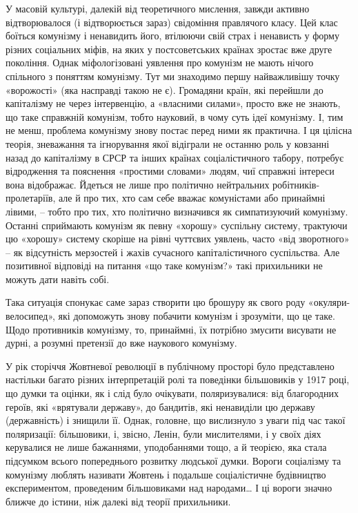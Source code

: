 \documentclass[../main]{subfiles}
\begin{document}
У масовій культурі, далекій від теоретичного мислення, завжди активно відтворювалося (і відтворюється зараз) свідоміння правлячого класу. Цей клас боїться комунізму і ненавидить його, втілюючи свій страх і ненависть у форму різних соціальних міфів, на яких у постсоветських країнах зростає вже друге покоління. Однак міфологізовані уявлення про комунізм не мають нічого спільного з поняттям комунізму. Тут ми знаходимо першу найважливішу точку «ворожості» (яка насправді такою не є). Громадяни країн, які перейшли до капіталізму не через інтервенцію, а «власними силами», просто вже не знають, що таке справжній комунізм, тобто науковий, в чому суть ідеї комунізму. І, тим не менш, проблема комунізму знову постає перед ними як практична. І ця цілісна теорія, зневажання та ігнорування якої відіграли не останню роль у ковзанні назад до капіталізму в СРСР та інших країнах соціалістичного табору, потребує відродження та пояснення «простими словами» людям, чиї справжні інтереси вона відображає. Йдеться не лише про політично нейтральних робітників-пролетаріїв, але й про тих, хто сам себе вважає комуністами або принаймні лівими, – тобто про тих, хто політично визначився як симпатизуючий комунізму. Останні сприймають комунізм як певну «хорошу» суспільну систему, трактуючи цю «хорошу» систему скоріше на рівні чуттєвих уявлень, часто «від зворотного» – як відсутність мерзостей і жахів сучасного капіталістичного суспільства. Але позитивної відповіді на питання «що таке комунізм?» такі прихильники не можуть дати навіть собі.

Така ситуація спонукає саме зараз створити цю брошуру як свого роду «окуляри-велосипед», які допоможуть знову побачити комунізм і зрозуміти, що це таке. Щодо противників комунізму, то, принаймні, їх потрібно змусити висувати не дурні, а розумні претензії до вже наукового комунізму.

У рік сторіччя Жовтневої революції в публічному просторі було представлено настільки багато різних інтерпретацій ролі та поведінки більшовиків у 1917 році, що думки та оцінки, як і слід було очікувати, поляризувалися: від благородних героїв, які «врятували державу», до бандитів, які ненавиділи цю державу (державність) і знищили її. Однак, головне, що вислизнуло з уваги під час такої поляризації: більшовики, і, звісно, Ленін, були мислителями, і у своїх діях керувалися не лише бажаннями, уподобаннями тощо, а й теорією, яка стала підсумком всього попереднього розвитку людської думки. Вороги соціалізму та комунізму люблять називати Жовтень і подальше соціалістичне будівництво експериментом, проведеним більшовиками над народами… І ці вороги значно ближче до істини, ніж далекі від теорії прихильники.
\end{document}
